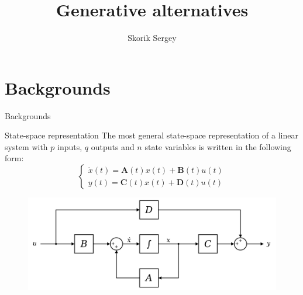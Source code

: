 \documentclass{beamer}
\title{Generative alternatives}
\author{Skorik Sergey}
\institute{MIPT, 2023}
\begin{document}
\begin{frame}
    \titlepage
\end{frame}

\begin{frame}
    \tableofcontents
\end{frame}

\section{Backgrounds}
\begin{frame}{Backgrounds}
    \begin{block}{State-space representation}
        The most general state-space representation of a linear system with $p$ inputs, $q$ outputs and $n$ state variables is written in the following form:
        \begin{equation}\label{SSR}
            \begin{cases}
                \Dot{x}(t) = \mathbf{A}(t)x(t) + \mathbf{B}(t)u(t) \\
                y(t) = \mathbf{C}(t)x(t) + \mathbf{D}(t)u(t)
            \end{cases}
        \end{equation}
    \end{block}
    \begin{figure}
        \centering
        \includegraphics[scale=0.1]{space_state_repr.png}
    \end{figure}
\end{frame}
\end{document}
